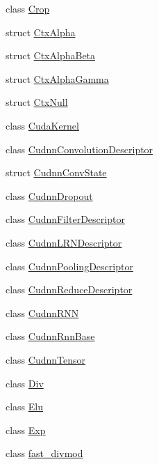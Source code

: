 \begin{DoxyCompactItemize}
\item 
class \mbox{\hyperlink{classonnxruntime_1_1cuda_1_1Crop}{Crop}}
\item 
struct \mbox{\hyperlink{structonnxruntime_1_1cuda_1_1CtxAlpha}{Ctx\+Alpha}}
\item 
struct \mbox{\hyperlink{structonnxruntime_1_1cuda_1_1CtxAlphaBeta}{Ctx\+Alpha\+Beta}}
\item 
struct \mbox{\hyperlink{structonnxruntime_1_1cuda_1_1CtxAlphaGamma}{Ctx\+Alpha\+Gamma}}
\item 
struct \mbox{\hyperlink{structonnxruntime_1_1cuda_1_1CtxNull}{Ctx\+Null}}
\item 
class \mbox{\hyperlink{classonnxruntime_1_1cuda_1_1CudaKernel}{Cuda\+Kernel}}
\item 
class \mbox{\hyperlink{classonnxruntime_1_1cuda_1_1CudnnConvolutionDescriptor}{Cudnn\+Convolution\+Descriptor}}
\item 
struct \mbox{\hyperlink{structonnxruntime_1_1cuda_1_1CudnnConvState}{Cudnn\+Conv\+State}}
\item 
class \mbox{\hyperlink{classonnxruntime_1_1cuda_1_1CudnnDropout}{Cudnn\+Dropout}}
\item 
class \mbox{\hyperlink{classonnxruntime_1_1cuda_1_1CudnnFilterDescriptor}{Cudnn\+Filter\+Descriptor}}
\item 
class \mbox{\hyperlink{classonnxruntime_1_1cuda_1_1CudnnLRNDescriptor}{Cudnn\+L\+R\+N\+Descriptor}}
\item 
class \mbox{\hyperlink{classonnxruntime_1_1cuda_1_1CudnnPoolingDescriptor}{Cudnn\+Pooling\+Descriptor}}
\item 
class \mbox{\hyperlink{classonnxruntime_1_1cuda_1_1CudnnReduceDescriptor}{Cudnn\+Reduce\+Descriptor}}
\item 
class \mbox{\hyperlink{classonnxruntime_1_1cuda_1_1CudnnRNN}{Cudnn\+R\+NN}}
\item 
class \mbox{\hyperlink{classonnxruntime_1_1cuda_1_1CudnnRnnBase}{Cudnn\+Rnn\+Base}}
\item 
class \mbox{\hyperlink{classonnxruntime_1_1cuda_1_1CudnnTensor}{Cudnn\+Tensor}}
\item 
class \mbox{\hyperlink{classonnxruntime_1_1cuda_1_1Div}{Div}}
\item 
class \mbox{\hyperlink{classonnxruntime_1_1cuda_1_1Elu}{Elu}}
\item 
class \mbox{\hyperlink{classonnxruntime_1_1cuda_1_1Exp}{Exp}}
\item 
class \mbox{\hyperlink{classonnxruntime_1_1cuda_1_1fast__divmod}{fast\+\_\+divmod}}

\end{DoxyCompactItemize}
